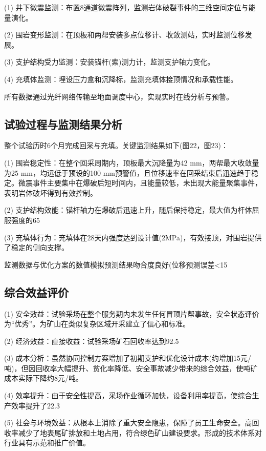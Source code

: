 \documentclass[twocolumn,a4paper,10pt]{article}
\begin{document}
(1) 井下微震监测：布置8通道微震阵列，监测岩体破裂事件的三维空间定位与能量演化。

(2) 围岩变形监测：在顶板和两帮安装多点位移计、收敛测站，实时监测位移发展。

(3) 支护结构受力监测：安装锚杆(索)测力计，监测支护轴力变化。

(4) 充填体监测：埋设压力盒和沉降标，监测充填体接顶情况和承载性能。

所有数据通过光纤网络传输至地面调度中心，实现实时在线分析与预警。

\subsection{试验过程与监测结果分析}
整个试验历时6个月完成回采与充填。关键监测结果如下(图22，图23)：

(1) 围岩稳定性：在整个回采周期内，顶板最大沉降量为42 mm，两帮最大收敛量为25 mm，均远低于预设的100 mm预警值，且位移速率在回采结束后迅速趋于稳定。微震事件主要集中在爆破后短时间内，且能量较低，未出现大能量聚集事件，表明岩体破坏得到有效控制。

(2) 支护结构效能：锚杆轴力在爆破后迅速上升，随后保持稳定，最大值为杆体屈服强度的65%

(3) 充填体行为：充填体在28天内强度达到设计值(2MPa)，有效接顶，对围岩提供了稳定的侧向支撑。

监测数据与优化方案的数值模拟预测结果吻合度良好(位移预测误差<15%

\subsection{综合效益评价}
(1) 安全效益：试验采场在整个服务期内未发生任何冒顶片帮事故，安全状态评价为“优秀”。为矿山在类似复杂区域开采建立了信心和标准。

(2) 经济效益：直接收益：试验采场矿石回收率达到92.5%

(3) 成本分析：虽然协同控制方案增加了初期支护和优化设计成本(约增加15元/吨)，但因回收率大幅提升、贫化率降低、安全事故减少带来的综合效益，使吨矿成本实际下降约8元/吨。

(4) 效率提升：由于安全性提高，采场作业循环加快，设备利用率提高，使综合生产效率提升了22.3%

(5) 社会与环境效益：从根本上消除了重大安全隐患，保障了员工生命安全。高回收率减少了地表尾矿排放和土地占用，符合绿色矿山建设要求。形成的技术体系对行业具有示范和推广价值。
\end{document}
